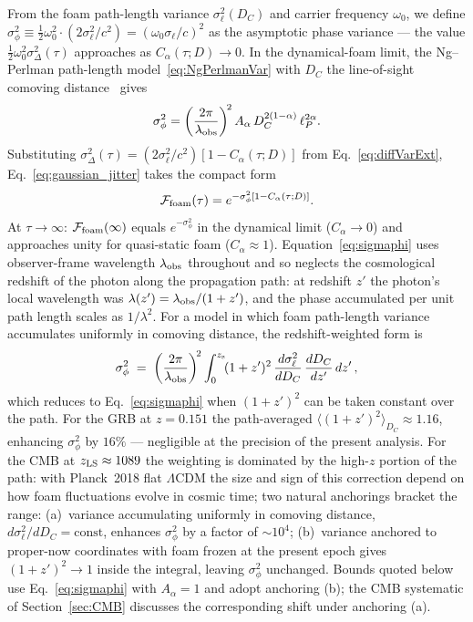 \documentclass[aps,prd,onecolumn,amsmath,amssymb]{revtex4-2}
\begin{document}
From the foam path-length variance $\sigma_\ell^2(D_C)$ and carrier
frequency $\omega_0$, we define $\sigma_\phi^2 \equiv
\tfrac{1}{2}\omega_0^2\cdot(2\sigma_\ell^2/c^2) = (\omega_0\sigma_\ell/c)^2$
as the asymptotic phase variance --- the value
$\tfrac{1}{2}\omega_0^2\sigma_\Delta^2(\tau)$ approaches as
$C_\alpha(\tau;D)\to 0$.  In the dynamical-foam limit, the
Ng--Perlman path-length model~\eqref{eq:NgPerlmanVar} with $D_C$ the
line-of-sight comoving distance~\cite{NgPerlman2022} gives
\begin{equation}
  \sigma_\phi^2 = \left(\frac{2\pi}{\lambda_{\rm obs}}\right)^{\!2}
    A_\alpha\,D_C^{2(1-\alpha)}\,\ell_P^{2\alpha}.
  \label{eq:sigmaphi}
\end{equation}
Substituting $\sigma_\Delta^2(\tau) =
(2\sigma_\ell^2/c^2)[1-C_\alpha(\tau;D)]$ from
Eq.~\eqref{eq:diffVarExt}, Eq.~\eqref{eq:gaussian_jitter} takes the compact form
\begin{equation}
  \mathcal{F}_{\rm foam}(\tau) = e^{-\sigma_\phi^2[1-C_\alpha(\tau;D)]}.
  \label{eq:Ffoam}
\end{equation}
At $\tau\to\infty$: $\mathcal{F}_{\rm foam}(\infty)$ equals
$e^{-\sigma_\phi^2}$ in the dynamical limit ($C_\alpha\to 0$) and
approaches unity for quasi-static foam ($C_\alpha\approx 1$).
Equation~\eqref{eq:sigmaphi} uses observer-frame wavelength
$\lambda_{\rm obs}$ throughout and so neglects the cosmological
redshift of the photon along the propagation path: at redshift $z'$
the photon's local wavelength was $\lambda(z') = \lambda_{\rm obs}/(1+z')$,
and the phase accumulated per unit path length scales as $1/\lambda^2$.
For a model in which foam path-length variance accumulates uniformly in
comoving distance, the redshift-weighted form is
\begin{equation}
  \sigma_\phi^2
  \;=\; \left(\frac{2\pi}{\lambda_{\rm obs}}\right)^{\!2}
        \int_0^{z_{\rm s}}\!(1+z')^2\,\frac{d\sigma_\ell^2}{dD_C}\,
        \frac{dD_C}{dz'}\,dz'\,,
  \label{eq:sigmaphi_cosmo}
\end{equation}
which reduces to Eq.~\eqref{eq:sigmaphi} when $(1+z')^2$ can be taken
constant over the path.  For the GRB at $z=0.151$ the path-averaged
$\langle(1+z')^2\rangle_{D_C}\approx 1.16$, enhancing $\sigma_\phi^2$
by $16\%$ --- negligible at the precision of the present analysis.
For the CMB at $z_{\rm LS}\approx 1089$ the weighting is dominated by
the high-$z$ portion of the path: with Planck~2018 flat $\Lambda$CDM
the size and sign of this correction depend on how foam fluctuations
evolve in cosmic time; two natural anchorings bracket the range:
(a)~variance accumulating uniformly in comoving distance,
$d\sigma_\ell^2/dD_C = \text{const}$, enhances $\sigma_\phi^2$ by a
factor of $\sim 10^4$;
(b)~variance anchored to proper-now coordinates with foam frozen at
the present epoch gives $(1+z')^2\to 1$ inside the integral,
leaving $\sigma_\phi^2$ unchanged.
Bounds quoted below use Eq.~\eqref{eq:sigmaphi} with $A_\alpha=1$ and
adopt anchoring (b); the CMB systematic of Section~\ref{sec:CMB}
discusses the corresponding shift under anchoring (a).
\end{document}
